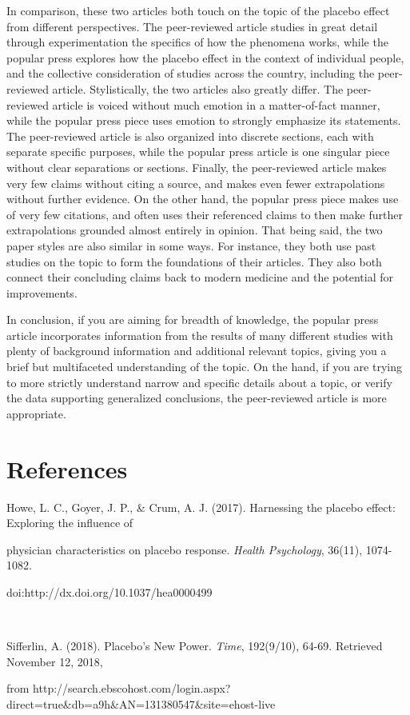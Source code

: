 \documentclass[a4paper, 10pt]{article}
\begin{document}
In comparison, these two articles both touch on the topic of the placebo effect from different perspectives. The peer-reviewed article studies in great detail through experimentation the specifics of how the phenomena works, while the popular press explores how the placebo effect in the context of individual people, and the collective consideration of studies across the country, including the peer-reviewed article. Stylistically, the two articles also greatly differ. The peer-reviewed article is
 voiced without much emotion in a matter-of-fact manner, while the popular press piece uses emotion to strongly emphasize its statements. The peer-reviewed article is also organized into discrete sections, each with separate specific purposes, while the popular press article is one singular piece without clear separations or sections. Finally, the peer-reviewed article makes very few claims without citing a source, and makes even fewer extrapolations without further evidence. On the other hand, the
 popular press piece makes use of very few citations, and often uses their referenced claims to then make further extrapolations grounded almost entirely in opinion. That being said, the two paper styles are also similar in some ways. For instance, they both use past studies on the topic to form the foundations of their articles. They also both connect their concluding claims back to modern medicine and the potential for improvements.
	
	In conclusion, if you are aiming for breadth of knowledge, the popular press article incorporates information from the results of many different studies with plenty of background information and additional relevant topics, giving you a brief but multifaceted understanding of the topic. On the hand, if you are trying to more strictly understand narrow and specific details about a topic, or verify the data supporting generalized conclusions, the peer-reviewed article is more appropriate. 

\newpage
\section*{References}

Howe, L. C., Goyer, J. P., \& Crum, A. J. (2017). Harnessing the placebo effect: Exploring the influence of 

physician characteristics on placebo response. \textit{Health Psychology}, 36(11), 1074-1082. 

doi:http://dx.doi.org/10.1037/hea0000499  

\

\noindent Sifferlin, A. (2018). Placebo's New Power. \textit{Time}, 192(9/10), 64-69. Retrieved November 12, 2018, 

from http://search.ebscohost.com/login.aspx?direct=true\&db=a9h\&AN=131380547\&site=ehost-live
\end{document}
